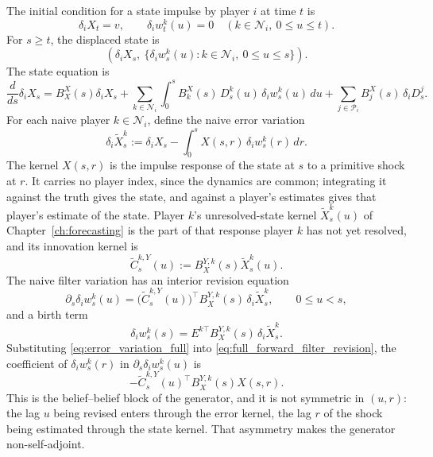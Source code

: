 The initial condition for a state impulse by player $i$ at time $t$ is
\begin{equation}\label{eq:seed_initial}
    \delta_i X_t=v,
    \qquad
    \delta_i w^k_t(u)=0\quad(k\in \mathcal N_i,\ 0\le u\le t).
\end{equation}
For $s\ge t$, the displaced state is
\begin{equation}
    \left(\delta_i X_s,\ \{\delta_i w^k_s(u):k\in \mathcal N_i,\ 0\le u\le s\}\right).
\end{equation}
The state equation is
\begin{equation}\label{eq:full_forward_state}
\boxed{
\frac{d}{ds}\delta_i X_s
=B^X_X(s)\delta_i X_s
+\sum_{k\in \mathcal N_i}\int_0^s B^X_k(s)\,D^k_s(u)\,\delta_i w^k_s(u)\,du
+\sum_{j\in \mathcal P_i}B^X_j(s)\,\delta_i D^j_s .
}
\end{equation}
For each naive player $k\in \mathcal N_i$, define the naive error variation
\begin{equation}\label{eq:error_variation_full}
    \delta_i\widetilde X^k_s
    :=\delta_i X_s-\int_0^s X(s,r)\,\delta_i w^k_s(r)\,dr .
\end{equation}
The kernel $X(s,r)$ is the impulse response of the state at $s$ to a primitive shock at $r$.  It carries no player index, since the dynamics are common; integrating it against the truth gives the state, and against a player's estimates gives that player's estimate of the state.  Player $k$'s unresolved-state kernel $\widetilde X^k_s(u)$ of Chapter~\ref{ch:forecasting} is the part of that response player $k$ has not yet resolved, and its innovation kernel is
\begin{equation}\label{eq:CY_def_full}
    \widetilde C^{k,Y}_s(u):=B^{Y,k}_X(s)\widetilde X^k_s(u).
\end{equation}
The naive filter variation has an interior revision equation
\begin{equation}\label{eq:full_forward_filter_revision}
\boxed{
    \partial_s\delta_i w^k_s(u)
    =\big(\widetilde C^{k,Y}_s(u)\big)^\top B^{Y,k}_X(s)\,\delta_i\widetilde X^k_s,
    \qquad 0\le u<s,
}
\end{equation}
and a birth term
\begin{equation}\label{eq:full_forward_filter_birth}
\boxed{
    \delta_i w^k_s(s)
    =E^{k\top}B^{Y,k}_X(s)\,\delta_i\widetilde X^k_s .
}
\end{equation}
Substituting \eqref{eq:error_variation_full} into \eqref{eq:full_forward_filter_revision}, the coefficient of $\delta_iw^k_s(r)$ in $\partial_s\delta_iw^k_s(u)$ is
\[
-\widetilde C^{k,Y}_s(u)^\top B^{Y,k}_X(s)X(s,r).
\]
This is the belief--belief block of the generator, and it is not symmetric in $(u,r)$: the lag $u$ being revised enters through the error kernel, the lag $r$ of the shock being estimated through the state kernel.  That asymmetry makes the generator non-self-adjoint.


